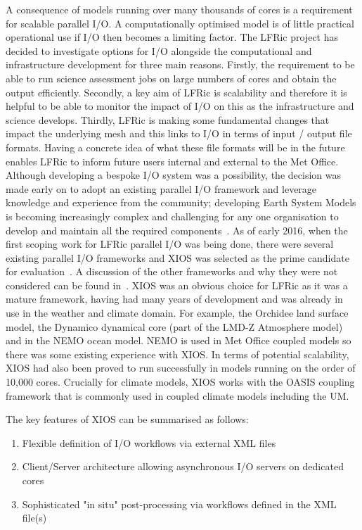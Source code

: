 \documentclass[times]{elsarticle}
\begin{document}
A consequence of models running over many thousands of cores is a requirement
for scalable parallel I/O. A computationally optimised model is of little practical
operational use if I/O then becomes a limiting factor. The LFRic project has
decided to investigate options for I/O alongside the computational
and infrastructure development for three main reasons. Firstly, the requirement
to be able to run science assessment jobs on large numbers of cores and obtain the
output efficiently. Secondly, a key aim of LFRic is scalability and therefore it is
helpful to be able to monitor the impact of I/O on this as the infrastructure and
science develops. Thirdly, LFRic is making some fundamental changes that impact the
underlying mesh and this links to I/O in terms of input / output file formats. Having
a concrete idea of what these file formats will be in the future enables LFRic to
inform future users internal and external to the Met Office.
Although developing a bespoke I/O system was a possibility, the decision was
made early on to adopt an existing parallel I/O framework and leverage knowledge and
experience from the community; developing Earth System Models is becoming increasingly
complex and challenging for any one organisation to develop and maintain all the required
components~\cite{gmd-2017-186}.
As of early 2016, when the first scoping work for LFRic parallel I/O was being done,
there were several existing parallel I/O frameworks and XIOS was selected as the prime
candidate for evaluation~\cite{XIOSWiki}. A discussion of the other frameworks and why
they were not considered can be found in~\cite{Adams2018}.
XIOS was an obvious choice for LFRic as it was a mature framework, having had many years
of development and was already in use in the weather and climate domain. For example,
the Orchidee land surface model, the Dynamico dynamical core (part of the LMD-Z
Atmosphere model) and in the NEMO ocean model. NEMO is used in Met Office coupled
models so there was some existing experience with XIOS. In terms of potential scalability,
XIOS had also been proved to run successfully in models running on the order of 10,000
cores. Crucially for climate models, XIOS works with the OASIS coupling framework that
is commonly used in coupled climate models including the UM. 

The key features of XIOS can be summarised as follows:
\begin{enumerate}
  \item Flexible definition of I/O workflows via external XML files
  \item Client/Server architecture allowing asynchronous I/O servers on dedicated cores
  \item Sophisticated "in situ" post-processing via workflows defined in the XML file(s) 
\end{enumerate}
\end{document}
